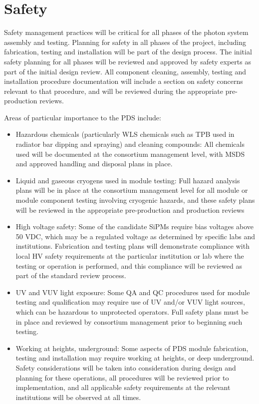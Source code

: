 \section{Safety}
\label{sec:fdsp-pd-safety}

Safety management practices will be critical for all phases of the photon system assembly and testing.  Planning for safety in all phases of the project, including fabrication, testing and installation will be part of the design process.  The initial safety planning for all phases will be reviewed and approved by safety experts as part of the initial design review.  All component cleaning, assembly, testing  and installation procedure documentation will include a section on safety concerns relevant to that procedure, and will be reviewed during the appropriate pre-production reviews.

Areas of particular importance to the PDS include:
\begin{itemize}
\item Hazardous chemicals (particularly WLS chemicals such as TPB used in radiator bar dipping and spraying) and cleaning compounds:  All chemicals used will be documented at the consortium management level, with MSDS and approved handling and disposal plans in place.

\item Liquid and gaseous cryogens used in module testing:  Full hazard analysis plans will be in place at the consortium management level for all module or module component testing involving cryogenic hazards, and these safety plans will be reviewed in the appropriate pre-production and production reviews

\item High voltage safety:  Some of the candidate SiPMs require bias voltages above 50 VDC, which may be a regulated voltage as determined by specific labs and institutions.  Fabrication and testing plans will demonstrate compliance with local HV safety requirements at the particular institution or lab where the testing or operation is performed, and this compliance will be reviewed as part of the standard review process.

\item UV and VUV light exposure:  Some QA and QC procedures used for module testing and qualification may require use of UV and/or VUV light sources, which can be hazardous  to unprotected operators.  Full safety plans must be in place and reviewed by consortium management prior to beginning such testing.

\item Working at heights, underground:  Some aspects of PDS module fabrication, testing and installation may require working at heights, or deep underground.  Safety considerations will be taken into consideration during design and planning for these operations, all procedures will be reviewed prior to implementation, and all applicable safety requirements at the relevant institutions will be observed at all times.

\end{itemize}
